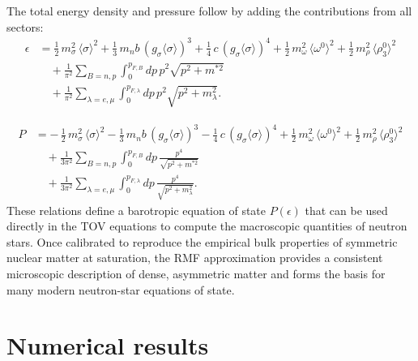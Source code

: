 The total energy density and pressure follow by adding the contributions from
all sectors:
\begin{equation}
\begin{aligned}
\epsilon &=
  \frac{1}{2}\,m_{\sigma}^{2}\,\langle\sigma\rangle^{2}
  + \frac{1}{3}\,m_{n}b\,(g_{\sigma}\langle\sigma\rangle)^{3}
  + \frac{1}{4}\,c\,(g_{\sigma}\langle\sigma\rangle)^{4}
  + \frac{1}{2}\,m_{\omega}^{2}\,\langle\omega^{0}\rangle^{2}
  + \frac{1}{2}\,m_{\rho}^{2}\,\langle\rho^{0}_{3}\rangle^{2} \\[0.3em]
&\quad
  + \frac{1}{\pi^{2}}\sum_{B=n,p}
    \int_{0}^{p_{F,B}}\!dp\,p^{2}\sqrt{p^{2}+m^{*2}} \\[0.3em]
&\quad
  + \frac{1}{\pi^{2}}\sum_{\lambda=e,\mu}
    \int_{0}^{p_{F,\lambda}}\!dp\,p^{2}
    \sqrt{p^{2}+m_{\lambda}^{2}}.
\end{aligned}
\label{eq:energy_density_total}
\end{equation}

\begin{equation}
\begin{aligned}
P &=
 -\,\frac{1}{2}\,m_{\sigma}^{2}\,\langle\sigma\rangle^{2}
 - \frac{1}{3}\,m_{n}b\,(g_{\sigma}\langle\sigma\rangle)^{3}
 - \frac{1}{4}\,c\,(g_{\sigma}\langle\sigma\rangle)^{4}
 + \frac{1}{2}\,m_{\omega}^{2}\,\langle\omega^{0}\rangle^{2}
 + \frac{1}{2}\,m_{\rho}^{2}\,\langle\rho^{0}_{3}\rangle^{2} \\[0.3em]
&\quad
  + \frac{1}{3\pi^{2}}\sum_{B=n,p}
    \int_{0}^{p_{F,B}}\!dp\,\frac{p^{4}}{\sqrt{p^{2}+m^{*2}}} \\[0.3em]
&\quad
  + \frac{1}{3\pi^{2}}\sum_{\lambda=e,\mu}
    \int_{0}^{p_{F,\lambda}}\!dp\,\frac{p^{4}}{\sqrt{p^{2}+m_{\lambda}^{2}}}.
\end{aligned}
\label{eq:pressure_total}
\end{equation}
These relations define a barotropic equation of state $P(\epsilon)$ that can be used
directly in the TOV equations to compute the macroscopic quantities
of neutron stars.  Once calibrated to reproduce the empirical bulk
properties of symmetric nuclear matter at saturation, the RMF approximation provides
a consistent microscopic description of dense, asymmetric matter and forms the
basis for many modern neutron-star equations of state.


\section{Numerical results}
\label{sec:npe_mu_results}

